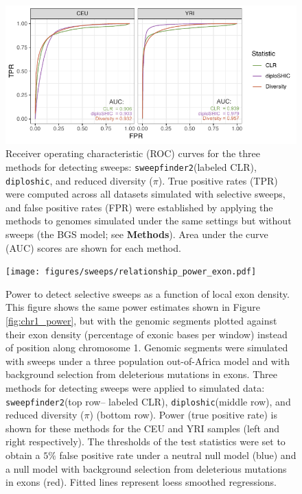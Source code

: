 \documentclass[hidelinks]{article}
\newcommand{\stopsupplement}{%
        \setcounter{table}{0}
        \renewcommand{\thetable}{\arabic{table}}%
        \setcounter{figure}{0}
        \renewcommand{\thefigure}{\arabic{figure}}%
     }
\newcommand{\sweepfinder}{\texttt{sweepfinder2}\xspace}
\newcommand{\diploshic}{\texttt{diploshic}\xspace}
\begin{document}
\begin{figure}[h]
    \centering
    \includegraphics[width=0.8 \textwidth]{figures/sweeps/roc_neutral_null.pdf}
    \caption{
    \label{fig:roc-curves}
    Receiver operating characteristic (ROC) curves for the three methods for detecting sweeps:
    \sweepfinder (labeled CLR), \diploshic, and reduced diversity ($\pi$).
    True positive rates (TPR) were computed across all datasets simulated with selective sweeps,
    and false positive rates (FPR) were established by applying the methods to genomes simulated
    under the same settings but without sweeps (the BGS model; see \textbf{Methods}).
    Area under the curve (AUC) scores are shown for each method.
    }
\end{figure}


\begin{figure}[h]
    \centering
    \texttt{[image: figures/sweeps/relationship\_power\_exon.pdf]}
    \caption{
        Power to detect selective sweeps
        as a function of local exon density.
        This figure shows the same power estimates shown in Figure \ref{fig:chr1_power},
        but with the genomic segments plotted against their
        exon density (percentage of exonic bases per window) instead of position along chromosome 1.
    	Genomic segments were simulated with sweeps under a three population out-of-Africa model
        and with background selection from deleterious mutations in exons.
        Three methods for detecting sweeps were applied to simulated data:
        \sweepfinder (top row-- labeled CLR),
        \diploshic (middle row),
        and reduced diversity ($\pi$) (bottom row).
        Power (true positive rate) is shown for these methods for the CEU and YRI
        samples (left and right respectively).
        The thresholds of the test statistics were set to obtain a
        $5\%$ false positive rate under a neutral null model (blue)
        and a null model with background selection from deleterious mutations in exons (red).
        Fitted lines represent loess smoothed regressions.
    }
    \label{fig:power-exon}
\end{figure}

\stopsupplement
\end{document}
